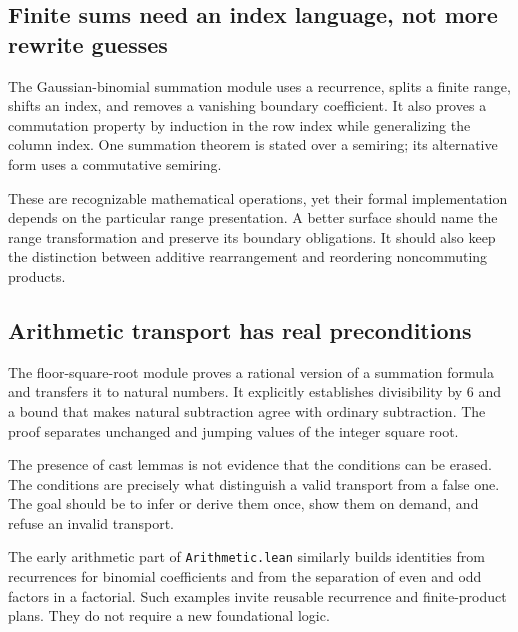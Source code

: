 \documentclass[11pt,a4paper]{article}
\newcommand{\code}[1]{\nolinkurl{#1}}
\theoremstyle{definition}
\theoremstyle{remark}
\numberwithin{equation}{section}
\begin{document}
\subsection{Finite sums need an index language, not more rewrite guesses}
The Gaussian-binomial summation module uses a recurrence, splits a finite range, shifts an index, and removes a vanishing boundary coefficient. It also proves a commutation property by induction in the row index while generalizing the column index. One summation theorem is stated over a semiring; its alternative form uses a commutative semiring.\cite{p-qpascal}

These are recognizable mathematical operations, yet their formal implementation depends on the particular range presentation. A better surface should name the range transformation and preserve its boundary obligations. It should also keep the distinction between additive rearrangement and reordering noncommuting products.

\subsection{Arithmetic transport has real preconditions}
The floor-square-root module proves a rational version of a summation formula and transfers it to natural numbers. It explicitly establishes divisibility by $6$ and a bound that makes natural subtraction agree with ordinary subtraction. The proof separates unchanged and jumping values of the integer square root.\cite{p-floor}

The presence of cast lemmas is not evidence that the conditions can be erased. The conditions are precisely what distinguish a valid transport from a false one. The goal should be to infer or derive them once, show them on demand, and refuse an invalid transport.

The early arithmetic part of \code{Arithmetic.lean} similarly builds identities from recurrences for binomial coefficients and from the separation of even and odd factors in a factorial. Such examples invite reusable recurrence and finite-product plans. They do not require a new foundational logic.\cite{p-arithmetic}
\end{document}
